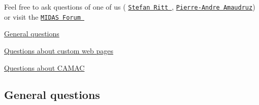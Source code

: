 \par
  \par
 Feel free to ask questions of one of us ( \href{mailto:midas@psi.ch}{\tt Stefan Ritt }, \href{mailto:midas@triumf.ca}{\tt Pierre-\/Andre Amaudruz}) or visit the \href{http://midas.triumf.ca/forum/Package}{\tt MIDAS Forum }


\begin{DoxyItemize}
\item \hyperlink{FAQ_FAQ_GENERAL}{General questions}
\item \hyperlink{FAQ_FAQ_CUSTOM}{Questions about custom web pages}
\item \hyperlink{FAQ_FAQ_CAMAC}{Questions about CAMAC}
\end{DoxyItemize}\hypertarget{FAQ_FAQ_GENERAL}{}\subsection{General questions}\label{FAQ_FAQ_GENERAL}

